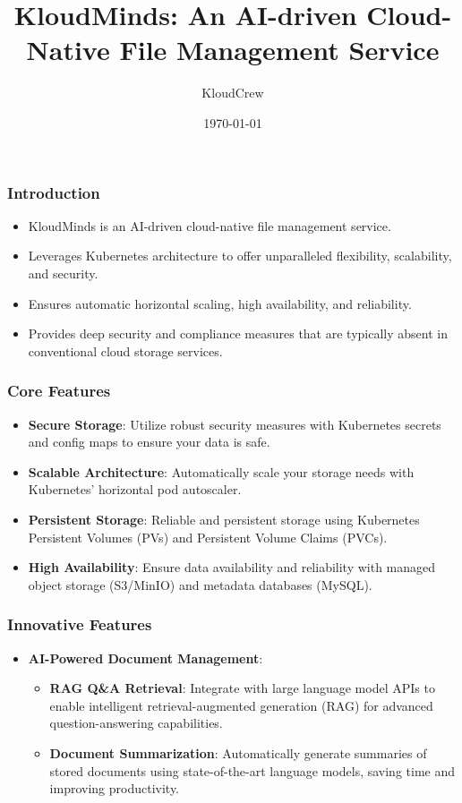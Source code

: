 \documentclass{beamer}
\title{KloudMinds: An AI-driven Cloud-Native File Management Service}
\author{KloudCrew}
\date{\today}
\begin{document}
\frame{\titlepage}

\begin{frame}
\frametitle{Introduction}
\begin{itemize}
    \item KloudMinds is an AI-driven cloud-native file management service.
    \item Leverages Kubernetes architecture to offer unparalleled flexibility, scalability, and security.
    \item Ensures automatic horizontal scaling, high availability, and reliability.
    \item Provides deep security and compliance measures that are typically absent in conventional cloud storage services.
\end{itemize}
\end{frame}

\begin{frame}
\frametitle{Core Features}
\begin{itemize}
    \item \textbf{Secure Storage}: Utilize robust security measures with Kubernetes secrets and config maps to ensure your data is safe.
    \item \textbf{Scalable Architecture}: Automatically scale your storage needs with Kubernetes' horizontal pod autoscaler.
    \item \textbf{Persistent Storage}: Reliable and persistent storage using Kubernetes Persistent Volumes (PVs) and Persistent Volume Claims (PVCs).
    \item \textbf{High Availability}: Ensure data availability and reliability with managed object storage (S3/MinIO) and metadata databases (MySQL).
\end{itemize}
\end{frame}

\begin{frame}
\frametitle{Innovative Features}
\begin{itemize}
    \item \textbf{AI-Powered Document Management}:
    \begin{itemize}
        \item \textbf{RAG Q\&A Retrieval}: Integrate with large language model APIs to enable intelligent retrieval-augmented generation (RAG) for advanced question-answering capabilities.
        \item \textbf{Document Summarization}: Automatically generate summaries of stored documents using state-of-the-art language models, saving time and improving productivity.
    \end{itemize}
\end{itemize}
\end{frame}
\end{document}
